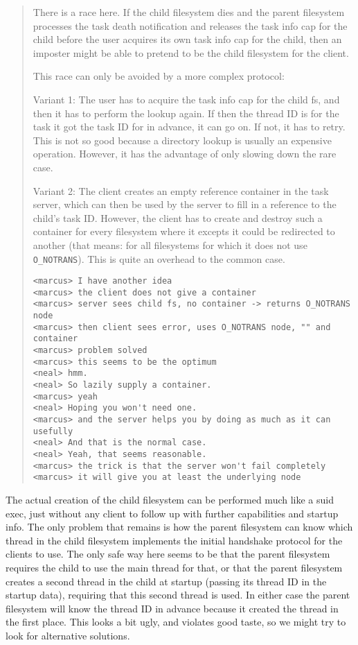 \documentclass[9pt,a4paper]{extarticle}
\newenvironment{comment}{\footnotesize \begin{quote}}{\end{quote}}
\begin{document}
\begin{comment}
  There is a race here.  If the child filesystem dies and the parent
  filesystem processes the task death notification and releases the
  task info cap for the child before the user acquires its own task
  info cap for the child, then an imposter might be able to pretend to
  be the child filesystem for the client.
  
  This race can only be avoided by a more complex protocol:
  
  Variant 1: The user has to acquire the task info cap for the child
  fs, and then it has to perform the lookup again.  If then the thread
  ID is for the task it got the task ID for in advance, it can go on.
  If not, it has to retry.  This is not so good because a directory
  lookup is usually an expensive operation.  However, it has the
  advantage of only slowing down the rare case.
  
  Variant 2: The client creates an empty reference container in the
  task server, which can then be used by the server to fill in a
  reference to the child's task ID.  However, the client has to create
  and destroy such a container for every filesystem where it excepts
  it could be redirected to another (that means: for all filesystems
  for which it does not use \verb/O_NOTRANS/).  This is quite an
  overhead to the common case.

\begin{verbatim}
<marcus> I have another idea
<marcus> the client does not give a container
<marcus> server sees child fs, no container -> returns O_NOTRANS node
<marcus> then client sees error, uses O_NOTRANS node, "" and container
<marcus> problem solved
<marcus> this seems to be the optimum
<neal> hmm.
<neal> So lazily supply a container.
<marcus> yeah
<neal> Hoping you won't need one.
<marcus> and the server helps you by doing as much as it can usefully
<neal> And that is the normal case.
<neal> Yeah, that seems reasonable.
<marcus> the trick is that the server won't fail completely
<marcus> it will give you at least the underlying node
\end{verbatim}
\end{comment}

The actual creation of the child filesystem can be performed much like
a suid exec, just without any client to follow up with further
capabilities and startup info.  The only problem that remains is how
the parent filesystem can know which thread in the child filesystem
implements the initial handshake protocol for the clients to use.  The
only safe way here seems to be that the parent filesystem requires the
child to use the main thread for that, or that the parent filesystem
creates a second thread in the child at startup (passing its thread ID
in the startup data), requiring that this second thread is used.  In
either case the parent filesystem will know the thread ID in advance
because it created the thread in the first place.  This looks a bit
ugly, and violates good taste, so we might try to look for alternative
solutions.
\end{document}
